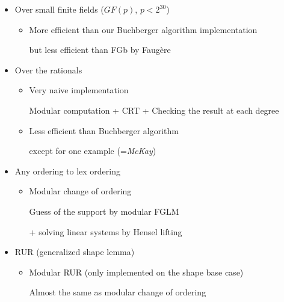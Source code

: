 \begin{slide}{}
\begin{itemize}
\item Over small finite fields ($GF(p)$, $p < 2^{30}$)
\begin{itemize}
\item More efficient than our Buchberger algorithm implementation

but less efficient than FGb by Faug\`ere
\end{itemize}

\item Over the rationals

\begin{itemize}
\item Very naive implementation

Modular computation + CRT + Checking the result at each degree

\item Less efficient than Buchberger algorithm

except for one example (={\it McKay})
\end{itemize}

\end{itemize}
\end{slide}

\begin{slide}{}

\begin{itemize}
\item Any ordering to lex ordering

\begin{itemize}
\item Modular change of ordering

Guess of the support by modular FGLM

+ solving linear systems by Hensel lifting

\end{itemize}

\item RUR (generalized shape lemma)

\begin{itemize}
\item Modular RUR (only implemented on the shape base case)

Almost the same as modular change of ordering
\end{itemize}

\end{itemize}
\end{slide}

